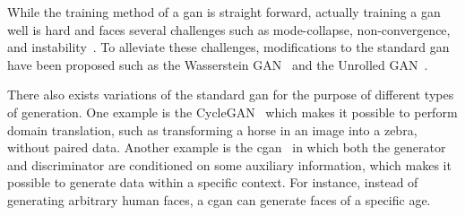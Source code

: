 \par
While the training method of a \gls*{gan} is straight forward, actually training a \gls*{gan} well is hard and faces several challenges such as mode-collapse, non-convergence, and instability~\cite{gan_challenges,gan_challenges2}. To alleviate these challenges, modifications to the standard \gls*{gan} have been proposed such as the Wasserstein GAN~\cite{wgan} and the Unrolled GAN~\cite{unrolled_gan}.
\par
There also exists variations of the standard \gls*{gan} for the purpose of different types of generation. One example is the CycleGAN~\cite{CycleGAN} which makes it possible to perform domain translation, such as transforming a horse in an image into a zebra, without paired data. Another example is the \gls*{cgan}~\cite{cgan}  in which both the generator and discriminator are conditioned on some auxiliary information, which makes it possible to generate data within a specific context. For instance, instead of generating arbitrary human faces, a \gls*{cgan} can generate faces of a specific age.
